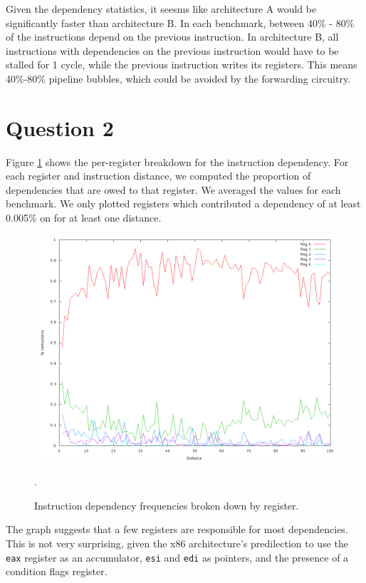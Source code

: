 Given the dependency statistics, it seesms like architecture A would be
significantly faster than architecture B. In each benchmark, between 40\% -
80\% of the instructions depend on the previous instruction. In architecture B,
all instructions with dependencies on the previous instruction would have to be
stalled for 1 cycle, while the previous instruction writes its registers. This
means 40\%-80\% pipeline bubbles, which could be avoided by the forwarding
circuitry.

\section{Question 2}

Figure \ref{q2:reg_frequencies} shows the per-register breakdown for the
instruction dependency. For each register and instruction distance, we computed
the proportion of dependencies that are owed to that register. We averaged the
values for each benchmark. We only plotted registers which contributed a
dependency of at least 0.005\% on for at least one distance.

\begin{figure}[htb]
  \includegraphics[width=6.8in]{6.823/lab1/figs/reg_frequencies.png}
  \caption{Instruction dependency frequencies broken down by register. }
  \label{q2:reg_frequencies}.
\end{figure}

The graph suggests that a few registers are responsible for most dependencies.
This is not very surprising, given the x86 architecture's predilection to use
the \texttt{eax} register as an accumulator, \texttt{esi} and \texttt{edi}
as pointers, and the presence of a condition flags register.

